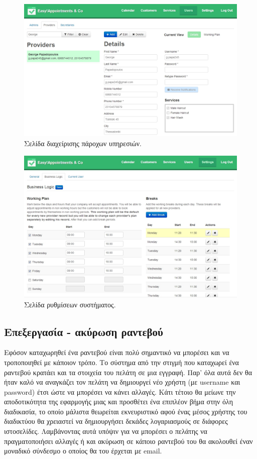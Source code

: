 \begin{figure}[ht!]
\centering
\includegraphics[width=130mm]{images/backend-providers.jpg}
\caption{Σελίδα διαχείρισης πάροχων υπηρεσιών.}
\label{backend-providers}
\end{figure}

\begin{figure}[ht!]
\centering
\includegraphics[width=130mm]{images/backend-settings.jpg}
\caption{Σελίδα ρυθμίσεων συστήματος.}
\label{book-settings}
\end{figure}

\subsection{Επεξεργασία - ακύρωση ραντεβού}
Εφόσον καταχωρηθεί ένα ραντεβού είναι πολύ σημαντικό να μπορέσει και να τροποποιηθεί με κάποιον τρόπο. Το σύστημα από την στιγμή που καταχωρεί ένα ραντεβού κρατάει και τα στοιχεία του πελάτη σε μια εγγραφή. Παρ' όλα αυτά δεν θα ήταν καλό να αναγκάζει τον πελάτη να δημιουργεί νέο χρήστη (με username και password) έτσι ώστε να μπορέσει να κάνει αλλαγές. Κάτι τέτοιο θα μείωνε την αποδοτικότητα της εφαρμογής μιας και προσθέτει ένα επιπλέον βήμα στην όλη διαδικασία, το οποίο μάλιστα θεωρείται εκνευριστικό αφού ένας μέσος χρήστης του διαδικτύου θα χρειαστεί να δημιουργήσει δεκάδες λογαριασμούς σε διάφορες ιστοσελίδες. Λαμβάνοντας αυτά υπόψιν για να μπορέσει ο πελάτης να πραγματοποιήσει αλλαγές ή και ακύρωση σε κάποιο ραντεβού του θα ακολουθεί έναν μοναδικό σύνδεσμο ο οποίος θα του έρχεται με email.

